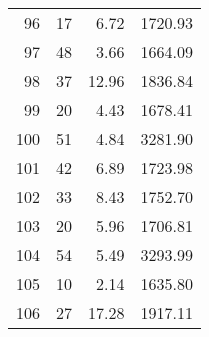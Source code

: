 \begin{appendix}
\begin{compacttable}
\begin{longtable}{@{}rrrr@{}}
96 & 17 & 6.72 & 1720.93 \\
97 & 48 & 3.66 & 1664.09 \\
98 & 37 & 12.96 & 1836.84 \\
99 & 20 & 4.43 & 1678.41 \\
100 & 51 & 4.84 & 3281.90 \\
101 & 42 & 6.89 & 1723.98 \\
102 & 33 & 8.43 & 1752.70 \\
103 & 20 & 5.96 & 1706.81 \\
104 & 54 & 5.49 & 3293.99 \\
105 & 10 & 2.14 & 1635.80 \\
106 & 27 & 17.28 & 1917.11 \\
\end{longtable}
\end{compacttable}


\end{appendix}
